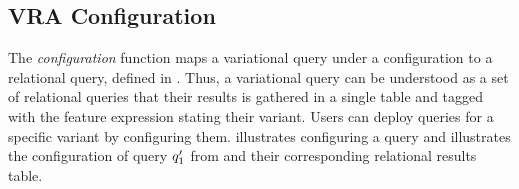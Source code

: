 \subsection{VRA Configuration}
\label{sec:vraconf}



%

%
The \emph{configuration} function maps a variational query under
a configuration
to a relational query, defined in . Thus, a variational query 
can be understood as a set of relational queries that their results is gathered
in a single table and tagged with the feature expression stating their variant.
%
Users can deploy queries for a specific variant by configuring 
them.
%
 illustrates configuring a query
and  illustrates the configuration of query $\VVal {\vQ_1}$ from  and their corresponding relational results table.



